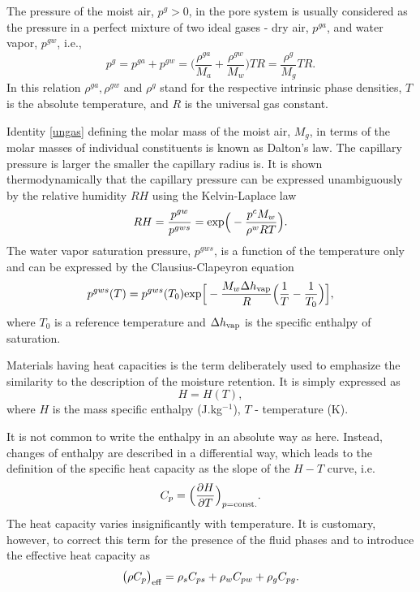 The pressure of the moist air, $p^g > 0$, in the pore system is usually considered as the pressure in a perfect 
mixture of two ideal gases - dry air, $p^{ga}$, and water vapor, $p^{gw}$, i.e.,
\begin{equation}\label{ungas}
p^g = p^{ga} + p^{gw}=\Big( \frac{\rho^{ga}}{M_a} + \frac{\rho^{gw}}{M_w} \Big)T 
R = \frac{\rho^{g}}{M_g}T R.
\end{equation}
In this relation $\rho^{ga}, \rho^{gw}$ and $\rho^{g}$ stand for the respective intrinsic phase densities, $T$ 
is the absolute temperature, and $R$ is the universal gas constant.
 
Identity \eqref{ungas} defining the molar mass of the moist air, $M_g$, in terms of the molar masses of individual 
constituents is known as Dalton's law. The capillary pressure is larger the smaller the capillary radius is. It is shown 
thermodynamically that the capillary pressure can be expressed unambiguously by the relative humidity $RH$ using 
the Kelvin-Laplace law
\begin{equation}\label{kelvinlapl}
RH = \frac{p^{gw}}{p^{gws}} = {\rm exp} \Big( - \frac{p^c M_w}{\rho^w R T} \Big).
\end{equation}
The water vapor saturation pressure, $p^{gws}$, is a function of the temperature only and can be expressed by the 
Clausius-Clapeyron equation
\begin{equation}\label{clausius}
p^{gws}(T) = p^{gws}(T_0) {\rm exp} \Big[ - \frac{M_w \Delta h_{\rm vap}}{R} \Big(\frac{1}{T} - 
\frac{1}{T_0} \Big) \Big],
\end{equation}
where $T_0$ is a reference temperature and $\Delta h_{\rm vap}$ is the specific enthalpy of saturation.

Materials having heat capacities is the term deliberately used 
to emphasize the similarity to the description of the moisture retention. It is simply expressed as
\begin{equation}
H =H(T),
\end{equation}
where $H$ is the mass specific enthalpy (J.kg$^{-1}$), $T$ - temperature (K).

It is not common to write the enthalpy in an absolute way as here. Instead, changes of enthalpy are 
described in a differential way, which leads to the definition of the specific heat capacity as the slope 
of the $H - T$ curve, i.e.
\begin{equation}\label{cap}
C_p = \Big( \frac{\partial H}{\partial T}\Big)_{p={\rm const.}}.
\end{equation}
The heat capacity varies insignificantly with temperature. It is customary, however, to correct this term 
for the presence of the fluid phases and to introduce the effective heat capacity as
\begin{equation}
\big( \rho C_p \big)_{\rm eff} = \rho_s C_{ps} + \rho_w C_{pw} + \rho_g C_{pg}.
\end{equation}\\


